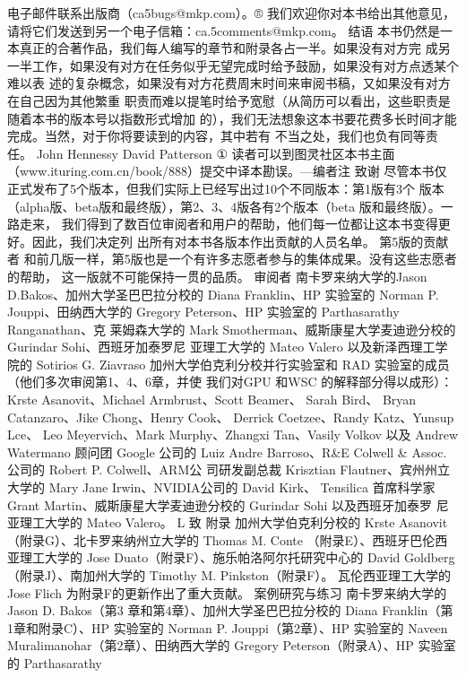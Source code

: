 电子邮件联系出版商（ca5bugs@mkp.com）。®
我们欢迎你对本书给出其他意见，请将它们发送到另一个电子信箱：ca.5comments@mkp.com。
结语
本书仍然是一本真正的合著作品，我们每人编写的章节和附录各占一半。如果没有对方完
成另一半工作，如果没有对方在任务似乎无望完成时给予鼓励，如果没有对方点透某个难以表
述的复杂概念，如果没有对方花费周末时间来审阅书稿，又如果没有对方在自己因为其他繁重
职责而难以提笔时给予宽慰（从简历可以看出，这些职责是随着本书的版本号以指数形式增加
的），我们无法想象这本书要花费多长时间才能完成。当然，对于你将要读到的内容，其中若有
不当之处，我们也负有同等责任。
John Hennessy
David Patterson
① 读者可以到图灵社区本书主面（www.ituring.com.cn/book/888）提交中译本勘误。—编者注
致谢
尽管本书仅正式发布了5个版本，但我们实际上已经写出过10个不同版本：第1版有3个
版本（alpha版、beta版和最终版），第2、3、4版各有2个版本（beta 版和最终版）。一路走来，
我们得到了数百位审阅者和用户的帮助，他们每一位都让这本书变得更好。因此，我们决定列
出所有对本书各版本作出贡献的人员名单。
第5版的贡献者
和前几版一样，第5版也是一个有许多志愿者参与的集体成果。没有这些志愿者的帮助，
这一版就不可能保持一贯的品质。
审阅者
南卡罗来纳大学的Jason D.Bakos、加州大学圣巴巴拉分校的 Diana Franklin、HP 实验室的
Norman P. Jouppi、田纳西大学的 Gregory Peterson、HP 实验室的 Parthasarathy Ranganathan、克
莱姆森大学的 Mark Smotherman、威斯康星大学麦迪逊分校的 Gurindar Sohi、西班牙加泰罗尼
亚理工大学的 Mateo Valero 以及新泽西理工学院的 Sotirios G. Ziavraso
加州大学伯克利分校并行实验室和 RAD 实验室的成员（他们多次审阅第1、4、6章，并使
我们对GPU 和WSC 的解释部分得以成形）：Krste Asanovit、Michael Armbrust、Scott Beamer、
Sarah Bird、 Bryan Catanzaro、Jike Chong、Henry Cook、 Derrick Coetzee、Randy Katz、Yunsup Lce、
Leo Meyervich、Mark Murphy、Zhangxi Tan、Vasily Volkov 以及 Andrew Watermano
顾问团
Google 公司的 Luiz Andre Barroso、R&E Colwell & Assoc.公司的 Robert P. Colwell、ARM公
司研发副总裁 Krisztian Flautner、宾州州立大学的 Mary Jane Irwin、NVIDIA公司的 David Kirk、
Tensilica 首席科学家 Grant Martin、威斯康星大学麦迪逊分校的 Gurindar Sohi 以及西班牙加泰罗
尼亚理工大学的 Mateo Valero。
L
致
附录
加州大学伯克利分校的 Krste Asanovit（附录G）、北卡罗来纳州立大学的 Thomas M. Conte
（附录E）、西班牙巴伦西亚理工大学的 Jose Duato（附录F）、施乐帕洛阿尔托研究中心的 David
Goldberg（附录J）、南加州大学的 Timothy M. Pinkston（附录F）。
瓦伦西亚理工大学的Jose Flich 为附录F的更新作出了重大贡献。
案例研究与练习
南卡罗来纳大学的 Jason D. Bakos（第3 章和第4章）、加州大学圣巴巴拉分校的 Diana
Franklin（第1章和附录C）、HP 实验室的 Norman P. Jouppi（第2章）、HP 实验室的 Naveen
Muralimanohar（第2章）、田纳西大学的 Gregory Peterson（附录A）、HP 实验室的 Parthasarathy

